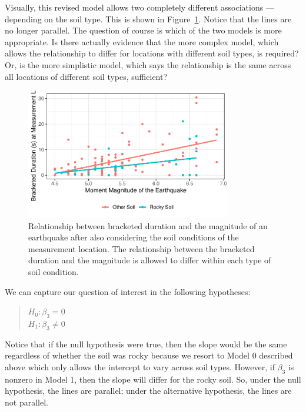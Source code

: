 \documentclass[
  letterpaper,
  DIV=11,
  numbers=noendperiod]{scrreprt}
\theoremstyle{definition}
\theoremstyle{definition}
\theoremstyle{plain}
\theoremstyle{remark}
\begin{document}
Visually, this revised model allows two completely different
associations --- depending on the soil type. This is shown in
Figure~\ref{fig-regextensions-int-plot}. Notice that the lines are no
longer parallel. The question of course is which of the two models is
more appropriate. Is there actually evidence that the more complex
model, which allows the relationship to differ for locations with
different soil types, is required? Or, is the more simplistic model,
which says the relationship is the same across all locations of
different soil types, sufficient?

\begin{figure}

{\centering \includegraphics[width=0.8\textwidth,height=\textheight]{./images/fig-regextensions-int-plot-1.pdf}

}

\caption{\label{fig-regextensions-int-plot}Relationship between
bracketed duration and the magnitude of an earthquake after also
considering the soil conditions of the measurement location. The
relationship between the bracketed duration and the magnitude is allowed
to differ within each type of soil condition.}

\end{figure}

We can capture our question of interest in the following hypotheses:

\begin{quote}
\(H_0: \beta_3 = 0\)\\
\(H_1: \beta_3 \neq 0\)
\end{quote}

Notice that if the null hypothesis were true, then the slope would be
the same regardless of whether the soil was rocky because we resort to
Model 0 described above which only allows the intercept to vary across
soil types. However, if \(\beta_3\) is nonzero in Model 1, then the
slope will differ for the rocky soil. So, under the null hypothesis, the
lines are parallel; under the alternative hypothesis, the lines are not
parallel.
\end{document}
